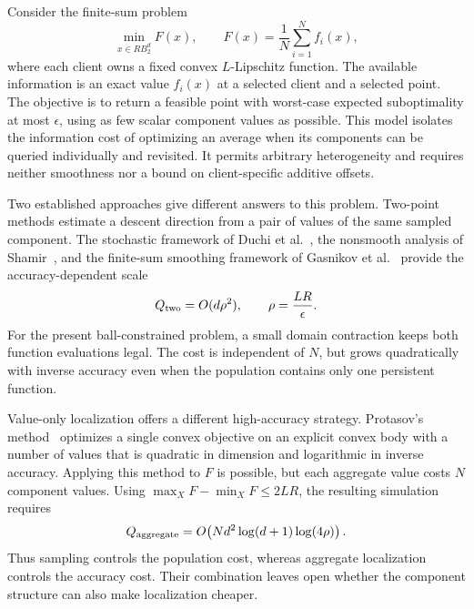 \documentclass[11pt]{article}
\numberwithin{equation}{section}
\theoremstyle{remark}
\theoremstyle{definition}
\newcommand{\Ball}{B_2}
\newcommand{\eps}{\epsilon}
\begin{document}
Consider the finite-sum problem
\begin{equation}
\min_{x\in R\Ball^d}F(x),\qquad
F(x)=\frac1N\sum_{i=1}^N f_i(x),
\label{eq:intro-model}
\end{equation}
where each client owns a fixed convex $L$-Lipschitz function.
The available information is an exact value $f_i(x)$ at a selected
client and a selected point. The objective is to return a feasible point
with worst-case expected suboptimality at most $\eps$, using as few
scalar component values as possible. This model isolates the information
cost of optimizing an average when its components can be queried
individually and revisited. It permits arbitrary heterogeneity and
requires neither smoothness nor a bound on client-specific additive
offsets.

Two established approaches give different answers to this problem.
Two-point methods estimate a descent direction from a pair of values of
the same sampled component. The stochastic framework of
Duchi et al.~\cite{duchi2015}, the nonsmooth analysis of
Shamir~\cite{shamir2017}, and the finite-sum smoothing framework of
Gasnikov et al.~\cite{gasnikov2022} provide the accuracy-dependent scale
\begin{equation}
Q_{\rm two}=O(d\rho^2),\qquad \rho=\frac{LR}{\eps}.
\label{eq:intro-two}
\end{equation}
For the present ball-constrained problem, a small domain contraction
keeps both function evaluations legal. The cost is independent of $N$,
but grows quadratically with inverse accuracy even when the population
contains only one persistent function.

Value-only localization offers a different high-accuracy strategy.
Protasov's method~\cite{protasov1996} optimizes a single convex objective
on an explicit convex body with a number of values that is quadratic in
dimension and logarithmic in inverse accuracy. Applying this method to
$F$ is possible, but each aggregate value costs $N$ component values.
Using $\max_XF-\min_XF\le2LR$, the resulting simulation requires
\begin{equation}
Q_{\rm aggregate}
=O\!\left(Nd^2\log(d+1)\log(4\rho)\right).
\label{eq:intro-aggregate}
\end{equation}
Thus sampling controls the population cost, whereas aggregate
localization controls the accuracy cost. Their combination leaves open
whether the component structure can also make localization cheaper.
\end{document}
